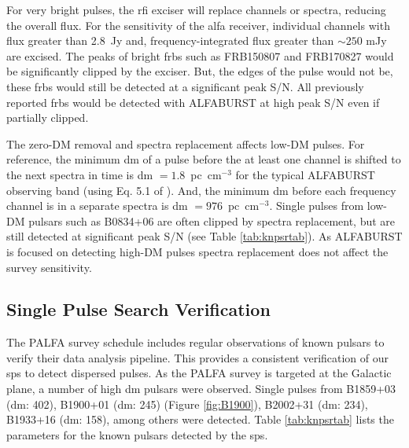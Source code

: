 \documentclass[a4paper,fleqn,usenatbib]{mnras}
\begin{document}
For very bright pulses, the \gls{rfi} exciser will replace channels or spectra,
reducing the overall flux.  For the sensitivity of the \gls{alfa} receiver,
individual channels with flux greater than 2.8~Jy and, frequency-integrated flux
greater than $\sim250$ mJy are excised. The peaks of bright \glspl{frb} such as
FRB150807 and FRB170827 would be significantly clipped by the exciser. But, the
edges of the pulse would not be, these \glspl{frb} would still be detected at a
significant peak S/N. All previously reported \glspl{frb} would be detected with
ALFABURST at high peak S/N even if partially clipped.

The zero-DM removal and spectra replacement affects low-DM pulses. For
reference, the minimum \gls{dm} of a pulse before the at least one channel is
shifted to the next spectra in time is \gls{dm} $=1.8$~pc~cm$^{-3}$ for the
typical ALFABURST observing band (using Eq. 5.1 of \cite{2004hpa..book.....L}).
And, the minimum \gls{dm} before each frequency channel is in a separate
spectra is \gls{dm} $=976$~pc~cm$^{-3}$. Single pulses from low-DM pulsars such
as B0834+06 are often clipped by spectra replacement, but are still detected at
significant peak S/N (see Table \ref{tab:knpsrtab}). As ALFABURST is focused on
detecting high-DM pulses spectra replacement does not affect the survey
sensitivity.



\subsection{Single Pulse Search Verification}
\label{sec:system_verify}

The PALFA survey schedule includes regular observations of known pulsars to
verify their data analysis pipeline. This provides a consistent verification of
our \gls{sps} to detect dispersed pulses. As the PALFA survey is targeted at the
Galactic plane, a number of high \gls{dm} pulsars were observed. Single pulses
from B1859+03 (\gls{dm}: 402), B1900+01 (\gls{dm}: 245) (Figure
\ref{fig:B1900}), B2002+31 (\gls{dm}: 234), B1933+16 (\gls{dm}: 158), among
others were detected. Table \ref{tab:knpsrtab} lists the parameters for the
known pulsars detected by the \gls{sps}.
\end{document}

